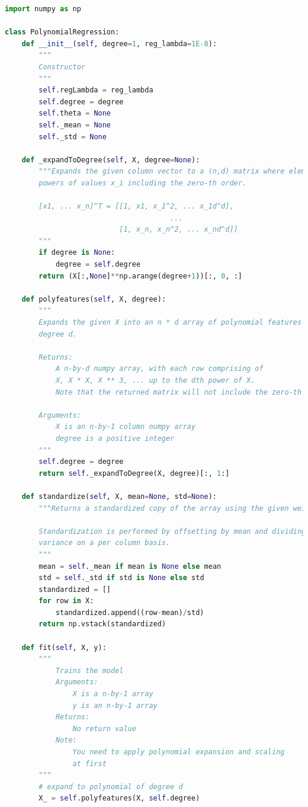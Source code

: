 \documentclass{article}
\newcommand{\1}{\mathbf{1}}
\begin{document}
\newpage
\begin{lstlisting}[language=Python]
import numpy as np

class PolynomialRegression:
    def __init__(self, degree=1, reg_lambda=1E-8):
        """
        Constructor
        """
        self.regLambda = reg_lambda
        self.degree = degree
        self.theta = None
        self._mean = None
        self._std = None

    def _expandToDegree(self, X, degree=None):
        """Expands the given column vector to a (n,d) matrix where elements are
        powers of values x_i including the zero-th order.

        [x1, ... x_n]^T = [[1, x1, x_1^2, ... x_1d^d],
                                       ...
                           [1, x_n, x_n^2, ... x_nd^d]]
        """
        if degree is None:
            degree = self.degree
        return (X[:,None]**np.arange(degree+1))[:, 0, :]

    def polyfeatures(self, X, degree):
        """
        Expands the given X into an n * d array of polynomial features of
        degree d.

        Returns:
            A n-by-d numpy array, with each row comprising of
            X, X * X, X ** 3, ... up to the dth power of X.
            Note that the returned matrix will not include the zero-th power.

        Arguments:
            X is an n-by-1 column numpy array
            degree is a positive integer
        """
        self.degree = degree
        return self._expandToDegree(X, degree)[:, 1:]

    def standardize(self, X, mean=None, std=None):
        """Returns a standardized copy of the array using the given weights.

        Standardization is performed by offsetting by mean and dividing by
        variance on a per column basis.
        """
        mean = self._mean if mean is None else mean
        std = self._std if std is None else std
        standardized = []
        for row in X:
            standardized.append((row-mean)/std)
        return np.vstack(standardized)

    def fit(self, X, y):
        """
            Trains the model
            Arguments:
                X is a n-by-1 array
                y is an n-by-1 array
            Returns:
                No return value
            Note:
                You need to apply polynomial expansion and scaling
                at first
        """
        # expand to polynomial of degree d
        X_ = self.polyfeatures(X, self.degree)


\end{lstlisting}
\end{document}
